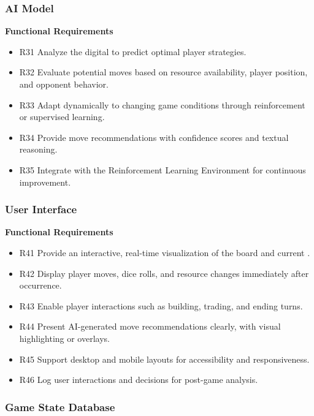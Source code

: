 \documentclass{article}
\begin{document}
\subsubsection{AI Model}

\textbf{Functional Requirements}

\begin{itemize}
  \item R31 Analyze the digital \GameState{} to predict optimal player strategies.
  \item R32 Evaluate potential moves based on resource availability, player position, and opponent behavior.
  \item R33 Adapt dynamically to changing game conditions through reinforcement or supervised learning.
  \item R34 Provide move recommendations with confidence scores and textual reasoning.
  \item R35 Integrate with the Reinforcement Learning Environment for continuous improvement.
\end{itemize}


\subsubsection{User Interface}

\textbf{Functional Requirements}

\begin{itemize}
  \item R41 Provide an interactive, real-time visualization of the \emph{\Catan{}} board and current \GameState{}.
  \item R42 Display player moves, dice rolls, and resource changes immediately after occurrence.
  \item R43 Enable player interactions such as building, trading, and ending turns.
  \item R44 Present AI-generated move recommendations clearly, with visual highlighting or overlays.
  \item R45 Support desktop and mobile layouts for accessibility and responsiveness.
  \item R46 Log user interactions and decisions for post-game analysis.
\end{itemize}


\subsubsection{Game State Database}
\end{document}
